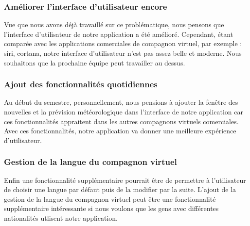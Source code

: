 \subsubsection{Améliorer l'interface d'utilisateur encore}

\indent Vue que nous avons déjà travaillé sur ce problématique, nous pensons que l'interface d'utilisateur de notre application a été amélioré. Cependant, étant comparée avec les applications comerciales de compagnon virtuel, par exemple : siri, cortana, notre interface d'utilisateur n'est pas assez belle et moderne. Nous souhaitons que la prochaine équipe peut travailler au dessus.

\subsubsection{Ajout des fonctionnalités quotidiennes}
\indent Au début du semestre, personnellement, nous pensions à ajouter la fenêtre des nouvelles et la prévision météorologique dans l'interface de notre application car ces fonctionnalités appraitent dans les autres compagnons virtuels comerciales. Avec ces fonctionnalités, notre application va donner une meilleure expérience d'utilisateur.

\subsubsection{Gestion de la langue du compagnon virtuel}
\indent Enfin une fonctionnalité supplémentaire pourrait être de permettre à l'utilisateur de choisir une langue par défaut puis de la modifier par la suite. L'ajout de la gestion de la langue du compagnon virtuel peut être une fonctionnalité supplémentaire intéressante si nous voulons que les gens avec différentes nationalités utlisent notre application.
\newpage